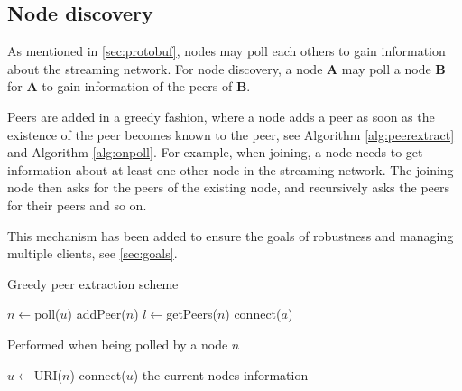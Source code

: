 \documentclass[10pt, a4paper]{article}
\begin{document}
\subsection{Node discovery}
\label{sec:node-discovery}

As mentioned in \autoref{sec:protobuf}, nodes may poll each others to
gain information about the streaming network. For node discovery, a
node \textbf{A} may poll a node \textbf{B} for \textbf{A} to gain
information of the peers of \textbf{B}.

Peers are added in a greedy fashion, where a node adds a peer as soon
as the existence of the peer becomes known to the peer, see Algorithm
\autoref{alg:peerextract} and Algorithm \autoref{alg:onpoll}. For
example, when joining, a node needs to get information about at least
one other node in the streaming network. The joining node then asks
for the peers of the existing node, and recursively asks the peers for
their peers and so on.

This mechanism has been added to ensure the goals of robustness and
managing multiple clients, see \autoref{sec:goals}.

\begin{algorithm}
  \caption{Greedy peer extraction scheme}
  \label{alg:peerextract}
  \begin{algorithmic}[1]
    \State $n \gets$poll($u$)
    \State addPeer($n$)
    \State $l \gets$getPeers($n$)
    \State connect($a$)
    \EndIf
    \EndFor
    \Else
    \State \Return
    \EndIf
    \EndProcedure
  \end{algorithmic}
\end{algorithm}

\begin{algorithm}
  \caption{Performed when being polled by a node $n$}
  \label{alg:onpoll}
  \begin{algorithmic}[1]
    \State $u\gets$URI($n$)
    \State connect($u$)
    \EndIf
    \State \Return the current nodes information
    \EndProcedure
  \end{algorithmic}
\end{algorithm}

\FloatBarrier
\end{document}
